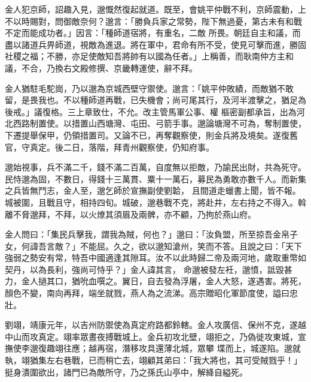 \begin{pinyinscope}
 金人犯京師，詔趣入見，邈慨然復起就道。既至，會姚平仲戰不利，京師震動，上不以時賜對，問御敵奈何？邈言：「勝負兵家之常勢，陛下無過憂，第古未有和戰不定而能成功者。」因言：「種師道宿將，有重名，二敵
 所畏。朝廷自主和議，而盡以諸道兵畀師道，視敵為進退。將在軍中，君命有所不受，使見可擊而進，勝固社稷之福；不勝，亦足使敵知吾將帥有以國為任者。」上稱善，而耿南仲方主和議，不合，乃換右文殿修撰、京畿轉運使，辭不拜。



 金人猶駐毛駝崗，乃以邈為京城西壁守禦使。邈言：「姚平仲敗績，而敵猶不敢留，是畏我也。不以種師道再戰，已失機會；尚可尾其行，及河半渡擊之，猶足為後戒。」議復格。三上章致仕，不允。改主管馬軍公事、權
 樞密副都承旨，出為河北西路制置使。以措置山西塘灣、屯田、弓箭手事。邈論塘灣不可為，奪制置使，下遷提舉保甲，仍領措置司。又論不已，再奪觀察使，則金兵將及境矣。遂復舊官，守真定。後二日，落階，拜青州觀察使，仍知府事。



 邈始視事，兵不滿二千，錢不滿二百萬，自度無以拒敵，乃諭民出財，共為死守。民恃邈為固，不數日，得錢十三萬貫、粟十一萬石，募民為勇敢亦數千人。而新集之兵皆無鬥志，金人至，邈乞師於宣撫副使劉韐，
 且間道走蠟書上聞，皆不報。城被圍，且戰且守，相持四旬。城破，邈巷戰不克，將赴井，左右持之不得入。斡離不脅邈拜，不拜，以火燎其須眉及兩髀，亦不顧，乃拘於燕山府。



 金人問曰：「集民兵擊我，謂我為賊，何也？」邈曰：「汝負盟，所至掠吾金帛子女，何諱吾言敵？」不能屈。久之，欲以邈知滄州，笑而不答。且說之曰：「天下強弱之勢安有常，特吾中國適逢其隙耳。汝不以此時歸二帝及兩河地，歲取重幣如契丹，以為長利，強尚可恃乎？」金人諱其言，
 命邈被發左衽，邈憤，詆毀甚力，金人撾其口，猶吮血噀之。翼日，自去發為浮屠，金人大怒，遂遇害。將死，顏色不變，南向再拜，端坐就戮，燕人為之流涕。高宗贈昭化軍節度使，謚曰忠壯。



 劉翊，靖康元年，以吉州防禦使為真定府路都鈴轄。金人攻廣信、保州不克，遂越中山而攻真定。翊率眾晝夜搏戰城上。金兵初攻北壁，翊拒之，乃偽徙攻東城，宣撫使李邈復趣翊往應；越再宿，潛移攻具還薄北城，眾攀
 堞而上，城遂陷。邈就執，翊猶集左右巷戰，已而稍亡去，翊顧其弟曰：「我大將也，其可受賊戮乎！」挺身潰圍欲出，諸門已為敵所守，乃之孫氏山亭中，解絳自縊死。




\end{pinyinscope}

